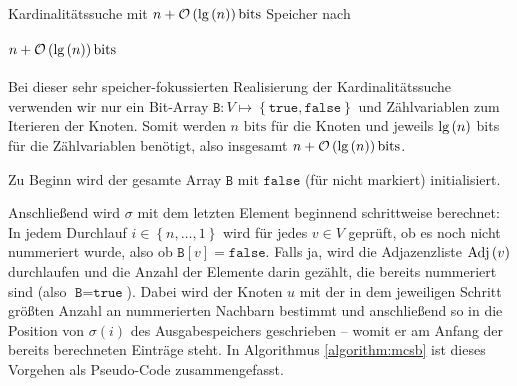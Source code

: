 \begin{algorithm}
	\SetAlgoVlined
	\caption{Kardinalitätssuche mit \( n + \mathcal{O} \left( \textnormal{lg} \left( n \right) \right) \text{bits} \) Speicher nach \cite[3.1]{sankardeep}}
	\label{algorithm:mcsb}
\end{algorithm}

\paragraph{\( n + \mathcal{O} \left( \textnormal{lg} \left( n \right) \right) \text{bits} \)}
Bei dieser sehr speicher-fokussierten Realisierung der Kar\-di\-na\-li\-täts\-suche verwenden wir nur ein Bit-Array \( \texttt{B} : V \mapsto \left\lbrace \texttt{true}, \texttt{false} \right\rbrace \) und Zählvariablen zum Iterieren der Knoten. Somit werden \( n \text{ bits} \) für die Knoten und jeweils \( \textnormal{lg} \left( n \right) \) bits für die Zählvariablen benötigt, also insgesamt \( n + \mathcal{O} \left( \textnormal{lg} \left( n \right) \right) \text{bits}\).

Zu Beginn wird der gesamte Array \( \texttt{B} \) mit \( \texttt{false} \) (für nicht markiert) initialisiert.

Anschließend wird \( \sigma \) mit dem letzten Element beginnend schrittweise berechnet:
In jedem Durchlauf \( i \in \left\lbrace n, \ldots, 1 \right\rbrace \) wird für jedes \( v \in V \) geprüft, ob es noch nicht nummeriert wurde, also ob \( \texttt{B}\left[ v \right] = \texttt{false} \). Falls ja, wird die Adjazenzliste \( \textnormal{Adj}\left( v \right) \) durchlaufen und die Anzahl der Elemente darin gezählt, die bereits nummeriert sind (also
\( \texttt{B} = \texttt{true} \)). Dabei wird der Knoten \( u \) mit der in dem jeweiligen Schritt größten Anzahl an nummerierten Nachbarn bestimmt und anschließend so in die Position von \( \sigma \left( i \right) \) des Ausgabespeichers geschrieben -- womit er am Anfang der bereits berechneten Einträge steht. In Algorithmus \ref{algorithm:mcsb} ist dieses Vorgehen als Pseudo-Code zusammengefasst.

